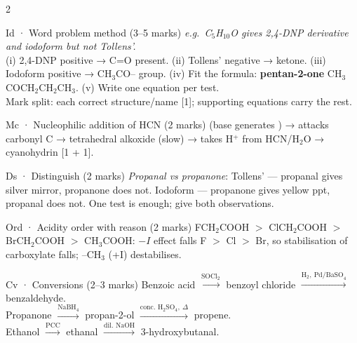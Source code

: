 \documentclass[10pt,a4paper]{extarticle}
\newcommand{\mk}[1]{{\scriptsize\color{black!55}[#1]}}
\begin{document}
\begin{multicols}{2}
\begin{skel}{Id · Word problem method (3--5 marks)}
\textit{e.g.\ C$_5$H$_{10}$O gives 2,4-DNP derivative and iodoform but not Tollens'.}\\
(i) 2,4-DNP positive → C=O present. (ii) Tollens' negative → ketone. (iii) Iodoform positive → CH$_3$CO-- group. (iv) Fit the formula: \textbf{pentan-2-one} CH$_3$COCH$_2$CH$_2$CH$_3$. (v) Write one equation per test.\\
Mark split: each correct structure/name \mk{1}; supporting equations carry the rest.
\end{skel}
\begin{skel}{Mc · Nucleophilic addition of HCN (2 marks)}
 (base generates ) →  attacks carbonyl C → tetrahedral alkoxide  (slow) → takes H$^+$ from HCN/H$_2$O → cyanohydrin  \mk{1 + 1}.
\end{skel}
\begin{skel}{Ds · Distinguish (2 marks)}
\textit{Propanal vs propanone}: Tollens' — propanal gives silver mirror, propanone does not. Iodoform — propanone gives yellow ppt, propanal does not. One test is enough; give both observations.
\end{skel}
\begin{skel}{Ord · Acidity order with reason (2 marks)}
FCH$_2$COOH $>$ ClCH$_2$COOH $>$ BrCH$_2$COOH $>$ CH$_3$COOH: $-I$ effect falls F $>$ Cl $>$ Br, so stabilisation of carboxylate falls; --CH$_3$ (+I) destabilises.
\end{skel}
\begin{skel}{Cv · Conversions (2--3 marks)}
Benzoic acid $\xrightarrow{\text{SOCl}_2}$ benzoyl chloride $\xrightarrow{\text{H}_2,\ \text{Pd/BaSO}_4}$ benzaldehyde.\\
Propanone $\xrightarrow{\text{NaBH}_4}$ propan-2-ol $\xrightarrow{\text{conc. H}_2\text{SO}_4,\ \Delta}$ propene.\\
Ethanol $\xrightarrow{\text{PCC}}$ ethanal $\xrightarrow{\text{dil. NaOH}}$ 3-hydroxybutanal.
\end{skel}


\end{multicols}
\end{document}
